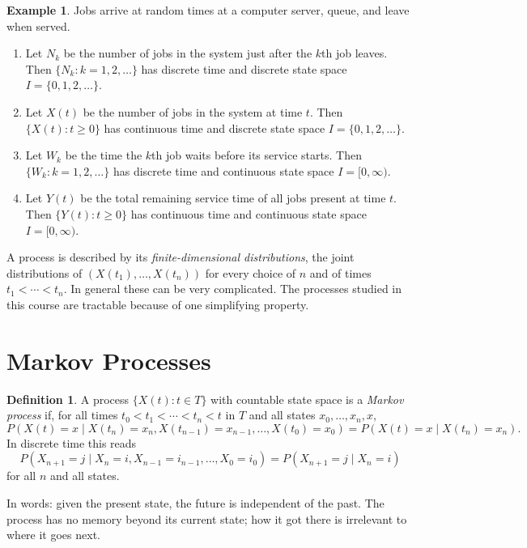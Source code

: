 \documentclass[12pt,a4paper]{report}
\theoremstyle{definition}
\newtheorem{defn}[thm]{Definition}
\newtheorem{exa}[thm]{Example}
\begin{document}
\begin{exa}
\label{ex:server}
Jobs arrive at random times at a computer server, queue, and leave when served.
\begin{enumerate}
\item Let $N_k$ be the number of jobs in the system just after the $k$th job leaves. Then
$\{N_k : k = 1, 2, \dots\}$ has discrete time and discrete state space $I = \{0, 1, 2, \dots\}$.
\item Let $X(t)$ be the number of jobs in the system at time $t$. Then $\{X(t) : t\geq 0\}$ has
continuous time and discrete state space $I = \{0, 1, 2, \dots\}$.
\item Let $W_k$ be the time the $k$th job waits before its service starts. Then
$\{W_k : k = 1, 2, \dots\}$ has discrete time and continuous state space $I = [0, \infty)$.
\item Let $Y(t)$ be the total remaining service time of all jobs present at time $t$. Then
$\{Y(t) : t\geq 0\}$ has continuous time and continuous state space $I = [0, \infty)$.
\end{enumerate}
\end{exa}

A process is described by its \emph{finite-dimensional distributions}, the joint
distributions of $(X(t_1), \dots, X(t_n))$ for every choice of $n$ and of times
$t_1<\cdots<t_n$. In general these can be very complicated. The processes studied in this
course are tractable because of one simplifying property.

\section{Markov Processes}

\begin{defn}
\label{def:markovprocess}
A process $\{X(t) : t\in T\}$ with countable state space is a \emph{Markov process} if, for all
times $t_0<t_1<\cdots<t_n<t$ in $T$ and all states $x_0, \dots, x_n, x$,
\[P\left(X(t) = x\mid X(t_n) = x_n, X(t_{n-1}) = x_{n-1}, \dots, X(t_0) = x_0\right) = P\left(X(t) = x\mid X(t_n) = x_n\right).\]
In discrete time this reads
\[P(X_{n + 1} = j\mid X_n = i, X_{n-1} = i_{n-1}, \dots, X_0 = i_0) = P(X_{n + 1} = j\mid X_n = i)\]
for all $n$ and all states.
\end{defn}

In words: given the present state, the future is independent of the past. The process has
no memory beyond its current state; how it got there is irrelevant to where it goes next.
\end{document}
